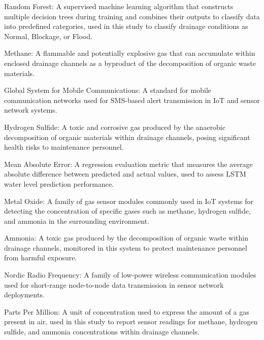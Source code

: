 \documentclass[12pt, a4paper]{article}
\begin{document}
\begin{description}[leftmargin=3cm, style=nextline]
    \item[RF] Random Forest: A supervised machine learning algorithm 
    that constructs multiple decision trees during training and 
    combines their outputs to classify data into predefined 
    categories, used in this study to classify drainage conditions 
    as Normal, Blockage, or Flood.

    \item[CH$_4$]
    Methane: A flammable and potentially explosive gas that can
    accumulate within enclosed drainage channels as a byproduct of
    the decomposition of organic waste materials.

    \item[GSM]
    Global System for Mobile Communications: A standard for
    mobile communication networks used for SMS-based alert
    transmission in IoT and sensor network systems.
 
    \item[H$_2$S]
    Hydrogen Sulfide: A toxic and corrosive gas produced by the
    anaerobic decomposition of organic materials within drainage
    channels, posing significant health risks to maintenance
    personnel.

    \item[MAE]
    Mean Absolute Error: A regression evaluation metric that
    measures the average absolute difference between predicted
    and actual values, used to assess LSTM water level prediction
    performance.

    \item[MQ]
    Metal Oxide: A family of gas sensor modules commonly used in
    IoT systems for detecting the concentration of specific gases
    such as methane, hydrogen sulfide, and ammonia in the
    surrounding environment.
 
    \item[NH$_3$]
    Ammonia: A toxic gas produced by the decomposition of organic
    waste within drainage channels, monitored in this system to
    protect maintenance personnel from harmful exposure.

    \item[NRF]
    Nordic Radio Frequency: A family of low-power wireless
    communication modules used for short-range node-to-node
    data transmission in sensor network deployments.
 
    \item[ppm]
    Parts Per Million: A unit of concentration used to express
    the amount of a gas present in air, used in this study to
    report sensor readings for methane, hydrogen sulfide, and
    ammonia concentrations within drainage channels.
    

\end{description}
\clearpage
{}
\end{document}
